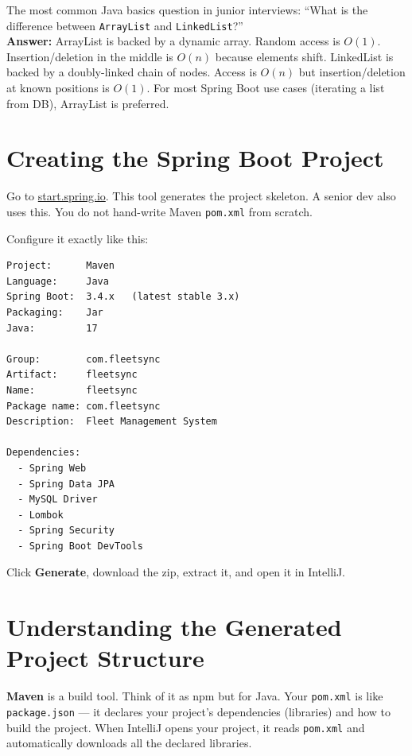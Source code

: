 \documentclass[12pt,a4paper]{report}
\newcommand{\code}[1]{\texttt{\textcolor{keywordblue}{#1}}}
\newcommand{\file}[1]{\texttt{\textcolor{successgreen}{#1}}}
\begin{document}
\begin{tcolorbox}[interviewbox]
The most common Java basics question in junior interviews: ``What is the difference between \code{ArrayList} and \code{LinkedList}?''\\[6pt]
\textbf{Answer:} ArrayList is backed by a dynamic array. Random access is $O(1)$. Insertion/deletion in the middle is $O(n)$ because elements shift. LinkedList is backed by a doubly-linked chain of nodes. Access is $O(n)$ but insertion/deletion at known positions is $O(1)$. For most Spring Boot use cases (iterating a list from DB), ArrayList is preferred.
\end{tcolorbox}

\section{Creating the Spring Boot Project}

\begin{tcolorbox}[aibox]
Go to \href{https://start.spring.io}{start.spring.io}. This tool generates the project skeleton. A senior dev also uses this. You do not hand-write Maven \code{pom.xml} from scratch.
\end{tcolorbox}

Configure it exactly like this:

\begin{lstlisting}[style=bashstyle,caption=Spring Initializr Settings]
Project:      Maven
Language:     Java
Spring Boot:  3.4.x   (latest stable 3.x)
Packaging:    Jar
Java:         17

Group:        com.fleetsync
Artifact:     fleetsync
Name:         fleetsync
Package name: com.fleetsync
Description:  Fleet Management System

Dependencies:
  - Spring Web
  - Spring Data JPA
  - MySQL Driver
  - Lombok
  - Spring Security
  - Spring Boot DevTools
\end{lstlisting}

Click \textbf{Generate}, download the zip, extract it, and open it in IntelliJ.

\section{Understanding the Generated Project Structure}

\begin{tcolorbox}[notebox]
\textbf{Maven} is a build tool. Think of it as npm but for Java. Your \file{pom.xml} is like \file{package.json} --- it declares your project's dependencies (libraries) and how to build the project. When IntelliJ opens your project, it reads \file{pom.xml} and automatically downloads all the declared libraries.
\end{tcolorbox}
\end{document}
